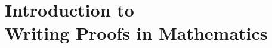 \chapter[Introduction to Writing Proofs in Mathematics]{Introduction to \\Writing Proofs in Mathematics} \label{C:intro}






%
\newpage


\endinput
